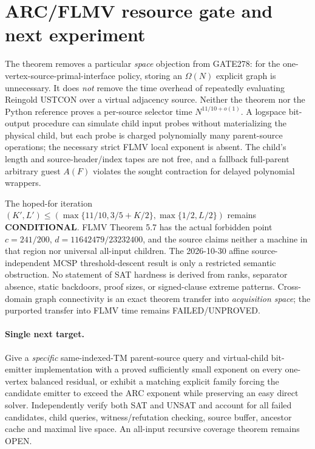 \documentclass[11pt]{article}
\begin{document}
\section{ARC/FLMV resource gate and next experiment}
The theorem removes a particular \emph{space} objection from GATE278: for the one-vertex-source-primal-interface policy, storing an $\Omega(N)$ explicit graph is unnecessary. It does \emph{not} remove the time overhead of repeatedly evaluating Reingold USTCON over a virtual adjacency source. Neither the theorem nor the Python reference proves a per-source selector time $N^{11/10+o(1)}$. A logspace bit-output procedure can simulate child input probes without materializing the physical child, but each probe is charged polynomially many parent-source operations; the necessary strict FLMV local exponent is absent. The child's length and source-header/index tapes are not free, and a fallback full-parent arbitrary guest $A(F)$ violates the sought contraction for delayed polynomial wrappers.

The hoped-for iteration $(K',L')\le(\max\{11/10,3/5+K/2\},\max\{1/2,L/2\})$ remains \textbf{CONDITIONAL}. FLMV Theorem 5.7 has the actual forbidden point $c=241/200$, $d=11642479/23232400$, and the source claims neither a machine in that region nor universal all-input children. The 2026-10-30 affine source-independent MCSP threshold-descent result is only a restricted semantic obstruction. No statement of SAT hardness is derived from ranks, separator absence, static backdoors, proof sizes, or signed-clause extreme patterns. Cross-domain graph connectivity is an exact theorem transfer into \emph{acquisition space}; the purported transfer into FLMV time remains FAILED/UNPROVED.

\paragraph{Single next target.} Give a \emph{specific} same-indexed-TM parent-source query and virtual-child bit-emitter implementation with a proved sufficiently small exponent on every one-vertex balanced residual, or exhibit a matching explicit family forcing the candidate emitter to exceed the ARC exponent while preserving an easy direct solver. Independently verify both SAT and UNSAT and account for all failed candidates, child queries, witness/refutation checking, source buffer, ancestor cache and maximal live space. An all-input recursive coverage theorem remains OPEN.


\end{document}
